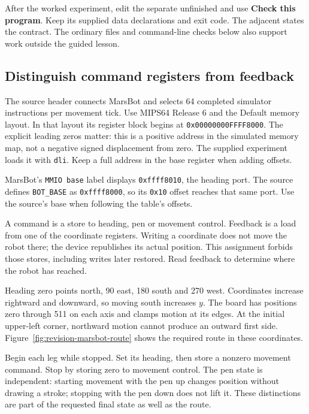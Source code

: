 After the worked experiment, edit the separate unfinished
 and use \textbf{Check this program}. Keep its
supplied data declarations and exit code. The adjacent
 states the contract. The ordinary files and
command-line checks below also support work outside the guided lesson.

\subsection*{Distinguish command registers from feedback}

The source header connects MarsBot and selects 64 completed simulator instructions
per movement tick. Use MIPS64 Release 6 and the Default memory layout. In that
layout its register block begins at \texttt{0x00000000FFFF8000}. The explicit
leading zeros matter: this is a positive address in the simulated memory map,
not a negative signed displacement from zero. The supplied experiment loads it
with \texttt{dli}. Keep a full address in the base register when adding offsets.

MarsBot's \texttt{MMIO base} label displays \texttt{0xffff8010}, the heading
port. The source defines \texttt{BOT\_BASE} as \texttt{0xffff8000}, so its
\texttt{0x10} offset reaches that same port. Use the source's base when following
the table's offsets.



A command is a store to heading, pen or movement control. Feedback is a load from
one of the coordinate registers. Writing a coordinate does not move the robot
there; the device republishes its actual position. This assignment forbids those
stores, including writes later restored. Read feedback to determine where the
robot has reached.

Heading zero points north, 90 east, 180 south and 270 west. Coordinates increase
rightward and downward, so moving south increases $y$. The board has positions
zero through 511 on each axis and clamps motion at its edges. At the initial
upper-left corner, northward motion cannot produce an outward first side.
Figure~\ref{fig:revision-marsbot-route} shows the required route in these coordinates.



Begin each leg while stopped. Set its heading, then store a nonzero movement
command. Stop by storing zero to movement control. The pen state is independent:
starting movement with the pen up changes position without drawing a stroke;
stopping with the pen down does not lift it. These distinctions are part of the
requested final state as well as the route.

